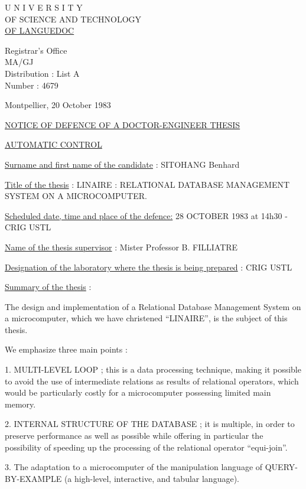 
\begin{center}
U N I V E R S I T Y\\
OF SCIENCE AND TECHNOLOGY\\
\uline{OF LANGUEDOC}

Registrar's Office\\
MA/GJ\\
Distribution : List A\\
Number : 4679
\end{center}

Montpellier, 20 October 1983

\begin{center}
\uline{NOTICE OF DEFENCE OF A DOCTOR-ENGINEER THESIS}

\uline{AUTOMATIC CONTROL}
\end{center}

\uline{Surname and first name of the candidate} : SITOHANG Benhard

\uline{Title of the thesis} : LINAIRE : RELATIONAL DATABASE MANAGEMENT SYSTEM ON A MICROCOMPUTER.

\uline{Scheduled date, time and place of the defence:} 28 OCTOBER 1983 at 14h30 - CRIG USTL

\uline{Name of the thesis supervisor} : Mister Professor B. FILLIATRE

\uline{Designation of the laboratory where the thesis is being prepared} : CRIG USTL

\uline{Summary of the thesis} :

The design and implementation of a Relational Database Management System on a microcomputer, which we have christened ``LINAIRE'', is the subject of this thesis.

We emphasize three main points :

1. MULTI-LEVEL LOOP ; this is a data processing technique, making it possible to avoid the use of intermediate relations as results of relational operators, which would be particularly costly for a microcomputer possessing limited main memory.

2. INTERNAL STRUCTURE OF THE DATABASE ; it is multiple, in order to preserve performance as well as possible while offering in particular the possibility of speeding up the processing of the relational operator ``equi-join''.

3. The adaptation to a microcomputer of the manipulation language of QUERY-BY-EXAMPLE (a high-level, interactive, and tabular language).

